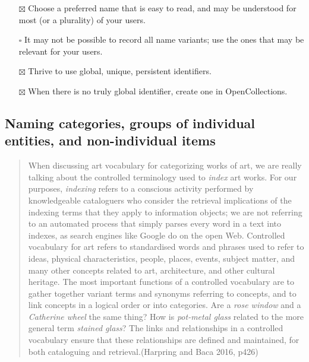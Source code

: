 \documentclass[
  letterpaper,
  DIV=11,
  numbers=noendperiod]{scrreprt}
\providecommand{\tightlist}{%
  \setlength{\itemsep}{0pt}\setlength{\parskip}{0pt}}\usepackage{longtable,booktabs,array}
\begin{document}
\begin{tcolorbox}[enhanced jigsaw, opacityback=0, bottomrule=.15mm, rightrule=.15mm, toptitle=1mm, breakable, colbacktitle=quarto-callout-tip-color!10!white, colback=white, title=\textcolor{quarto-callout-tip-color}{\faLightbulb}\hspace{0.5em}{Tips for individual names of things}, leftrule=.75mm, toprule=.15mm, left=2mm, arc=.35mm, colframe=quarto-callout-tip-color-frame, coltitle=black, titlerule=0mm, bottomtitle=1mm, opacitybacktitle=0.6]

\begin{itemize}
\tightlist
\item[$\boxtimes$]
  Choose a preferred name that is easy to read, and may be understood
  for most (or a plurality) of your users.
\item[$\square$]
  It may not be possible to record all name variants; use the ones that
  may be relevant for your users.
\item[$\boxtimes$]
  Thrive to use global, unique, persistent identifiers.
\item[$\boxtimes$]
  When there is no truly global identifier, create one in
  OpenCollections.
\end{itemize}

\end{tcolorbox}

\subsection{Naming categories, groups of individual entities, and
non-individual
items}\label{naming-categories-groups-of-individual-entities-and-non-individual-items}

\begin{quote}
When discussing art vocabulary for categorizing works of art, we are
really talking about the controlled terminology used to \emph{index} art
works. For our purposes, \emph{indexing} refers to a conscious activity
performed by knowledgeable cataloguers who consider the retrieval
implications of the indexing terms that they apply to information
objects; we are not referring to an automated process that simply parses
every word in a text into indexes, as search engines like Google do on
the open Web. Controlled vocabulary for art refers to standardised words
and phrases used to refer to ideas, physical characteristics, people,
places, events, subject matter, and many other concepts related to art,
architecture, and other cultural heritage. The most important functions
of a controlled vocabulary are to gather together variant terms and
synonyms referring to concepts, and to link concepts in a logical order
or into categories. Are a \emph{rose window} and a \emph{Catherine
wheel} the same thing? How is \emph{pot-metal glass} related to the more
general term \emph{stained glass}? The links and relationships in a
controlled vocabulary ensure that these relationships are defined and
maintained, for both cataloguing and retrieval.(Harpring and Baca 2016,
p426)
\end{quote}
\end{document}
